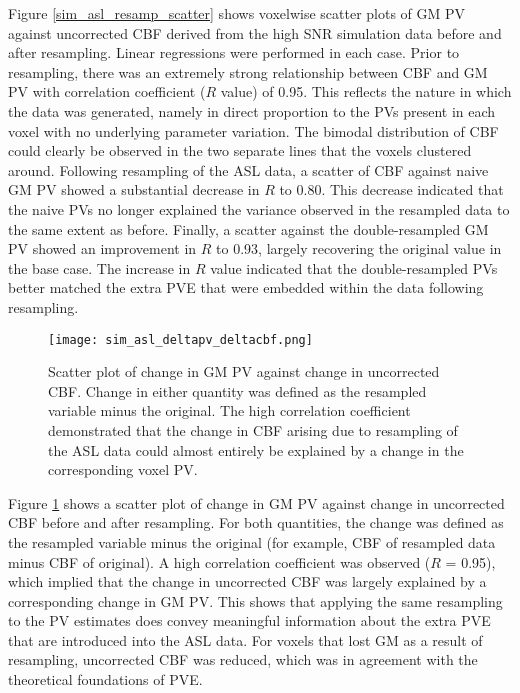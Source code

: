 Figure \ref{sim_asl_resamp_scatter} shows voxelwise scatter plots of GM PV against uncorrected CBF derived from the high SNR simulation data before and after resampling. Linear regressions were performed in each case. Prior to resampling, there was an extremely strong relationship between CBF and GM PV with correlation coefficient ($R$ value) of 0.95. This reflects the nature in which the data was generated, namely in direct proportion to the PVs present in each voxel with no underlying parameter variation. The bimodal distribution of CBF could clearly be observed in the two separate lines that the voxels clustered around. Following resampling of the ASL data, a scatter of CBF against naive GM PV showed a substantial decrease in $R$ to 0.80. This decrease indicated that the naive PVs no longer explained the variance observed in the resampled data to the same extent as before. Finally, a scatter against the double-resampled GM PV showed an improvement in $R$ to 0.93, 
largely recovering the original value in the base case. The increase in $R$ value indicated that the double-resampled PVs better matched the extra PVE that were embedded within the data following resampling. 

\begin{figure}[H]
\centering
\texttt{[image: sim\_asl\_deltapv\_deltacbf.png]}
\caption{Scatter plot of change in GM PV against change in uncorrected CBF. Change in either quantity was defined as the resampled variable minus the original. The high correlation coefficient demonstrated that the change in CBF arising due to resampling of the ASL data could almost entirely be explained by a change in the corresponding voxel PV.}
\label{sim_asl_deltapv_deltacbf}
\end{figure}

Figure \ref{sim_asl_deltapv_deltacbf} shows a scatter plot of change in GM PV against change in uncorrected CBF before and after resampling. For both quantities, the change was defined as the resampled variable minus the original (for example, CBF of resampled data minus CBF of original). A high correlation coefficient was observed ($R$ = 0.95), which implied that the change in uncorrected CBF was largely explained by a corresponding change in GM PV. This shows that applying the same resampling to the PV estimates does convey meaningful information about the extra PVE that are introduced into the ASL data. For voxels that lost GM as a result of resampling, uncorrected CBF was reduced, which was in agreement with the theoretical foundations of PVE. 

